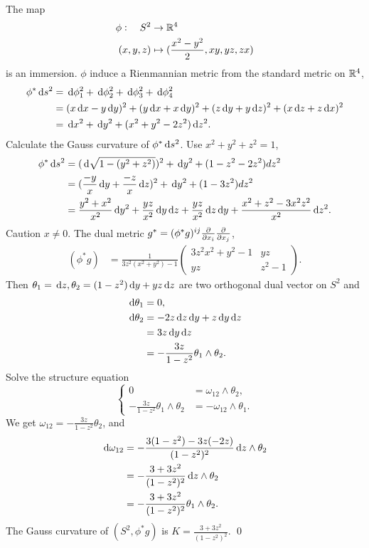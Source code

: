 \begin{enumerate}
\prob The map
\begin{align*}
	\phi:\quad S^2 &\to \mathbb{R}^4 \\
	(x,y,z) &\mapsto (\frac{x^2-y^2}{2},xy,yz,zx)
\end{align*}
is an immersion. $\phi$ induce a Rienmannian metric from the standard metric on $\mathbb{R}^4$, 
\begin{align*}
	\phi^* \,\mathrm{d} s^2 &= \,\mathrm{d} \phi_1^2+ \,\mathrm{d} \phi_2^2+ \,\mathrm{d} \phi_3^2+ \,\mathrm{d} \phi_4^2 \\
	&= (x \,\mathrm{d} x-y \,\mathrm{d} y)^2 + (y\,\mathrm{d} x+x\,\mathrm{d} y)^2 + (z\,\mathrm{d} y+y\,\mathrm{d} z)^2 + (x\,\mathrm{d} z+z\,\mathrm{d} x)^2 \\
	&= \,\mathrm{d} x^2 + \,\mathrm{d} y^2 + (x^2+y^2-2z^2)\,\mathrm{d} z^2.
\end{align*}
Calculate the Gauss curvature of $\phi^* \,\mathrm{d} s^2$.
\soln
Use $x^2+y^2+z^2=1$, \begin{align*}
	\phi^* \,\mathrm{d} s^2 &= (\,\mathrm{d} \sqrt{1-(y^2+z^2)})^2+\,\mathrm{d} y^2+ (1-z^2-2z^2)d z^2 \\
	&= (\frac{-y}{x}\,\mathrm{d} y+\frac{-z}{x}\,\mathrm{d} z)^2+\,\mathrm{d} y^2+ (1-3z^2)d z^2 \\
	&= \frac{y^2+x^2}{x^2} \,\mathrm{d} y^2 +\frac{yz}{x^2}\,\mathrm{d} y\,\mathrm{d} z +\frac{yz}{x^2}\,\mathrm{d} z\,\mathrm{d} y+ \frac{x^2+z^2-3x^2z^2}{x^2}\,\mathrm{d} z^2.
\end{align*}
Caution $x\neq 0$. The dual metric $g^*= (\phi^*g)^{ij}\frac{\partial }{\partial {x_i}}\frac{\partial }{\partial {x_j}}$, \begin{align*}
	(\phi^*g) &= \frac{1}{3z^2(x^2+y^2)-1} \begin{pmatrix}
		3z^2x^2+y^2-1 & yz \\
		yz & z^2-1
	\end{pmatrix} .
\end{align*}
Then $\theta_1=\,\mathrm{d} z, \theta_2=(1-z^2)\,\mathrm{d} y+yz\,\mathrm{d} z$ are two orthogonal dual vector on $S^2$ and \begin{align*}
	\,\mathrm{d}\theta_1 &=0, \\
	\,\mathrm{d}\theta_2 &= -2z\,\mathrm{d} z \,\mathrm{d} y+z\,\mathrm{d} y\,\mathrm{d} z \\
	&= 3z \,\mathrm{d} y\,\mathrm{d} z \\
	&= -\frac{3z}{1-z^2} \theta_1\wedge \theta_2.
\end{align*}
Solve the structure equation 
$$\left\{\begin{aligned}
	0 &=\omega_{12}\wedge \theta_2, \\
	-\frac{3z}{1-z^2} \theta_1\wedge \theta_2 &=-\omega_{12}\wedge \theta_1.
\end{aligned}\right. $$
We get $\omega_{12}= -\frac{3z}{1-z^2} \theta_2$, and \begin{align*}
	\,\mathrm{d} \omega_{12} &= -\frac{3(1-z^2)-3z(-2z)}{(1-z^2)^2}\,\mathrm{d} z\wedge \theta_2 \\
	&= -\frac{3+3z^2}{(1-z^2)^2}\,\mathrm{d} z\wedge \theta_2 \\
	&= -\frac{3+3z^2}{(1-z^2)^2} \theta_1\wedge \theta_2.
\end{align*}
The Gauss curvature of $(S^2, \phi^* g)$ is $K=\frac{3+3z^2}{(1-z^2)^2}$.
\qed


\end{enumerate}
